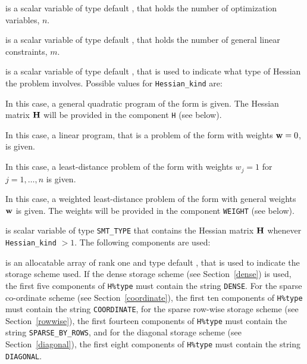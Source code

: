 \documentclass{galahad}
\begin{document}
\begin{description}

 is a scalar variable of type default \integer, 
 that holds the number of optimization variables, $n$.  
              
 is a scalar variable of type default \integer, 
 that holds the number of general linear constraints, $m$.
              
 is a scalar variable of type default \integer, 
that is used to indicate what type of Hessian the problem involves.
Possible values for {\tt Hessian\_kind} are:

\begin{description}
  In this case, a general quadratic program of the form
 is given. The Hessian matrix ${\mathbf{H}}$ will be provided in the 
component {\tt H} (see below).

  In this case, a linear program, that is a problem of the form 
 with weights ${\mathbf{w}} = 0$, is given.

 In this case, a least-distance problem of the form 
with weights $w_{j} = 1$ for $j = 1, \ldots , n$ is given.

 In this case, a weighted least-distance problem of the form 
with general weights ${\mathbf{w}}$ is given. The weights will be
provided in the component {\tt WEIGHT} (see below).
\end{description}

 is scalar variable of type {\tt SMT\_TYPE} 
that contains the Hessian matrix ${\mathbf{H}}$ whenever {\tt Hessian\_kind} $>1$.
The following components are used:

\begin{description}

 is an allocatable array of rank one and type default \character, 
that is used to indicate the storage scheme used. If the dense storage scheme 
(see Section~\ref{dense}) is used, 
the first five components of {\tt H\%type} must contain the
string {\tt DENSE}.
For the sparse co-ordinate scheme (see Section~\ref{coordinate}), 
the first ten components of {\tt H\%type} must contain the
string {\tt COORDINATE},  
for the sparse row-wise storage scheme (see Section~\ref{rowwise}),
the first fourteen components of {\tt H\%type} must contain the
string {\tt SPARSE\_BY\_ROWS},
and for the diagonal storage scheme (see Section~\ref{diagonal}),
the first eight components of {\tt H\%type} must contain the
string {\tt DIAGONAL}.


\end{description}
\end{description}
\end{document}
